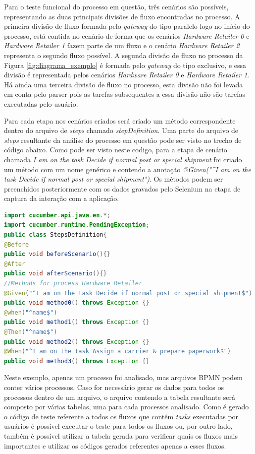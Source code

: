 \documentclass[12pt]{article}
\begin{document}
Para o teste funcional do processo em questão, três cenários são possíveis, representando as duas principais divisões de fluxo encontradas no processo. A primeira divisão de fluxo formada pelo \emph{gateway} do tipo paralelo logo no início do processo, está contida no cenário de forma que os cenários \emph{Hardware Retailer 0} e \emph{Hardware Retailer 1} fazem parte de um fluxo e o cenário \emph{Hardware Retailer 2} representa o segundo fluxo possível. A segunda divisão de fluxo no processo da Figura \ref{fig:diagrama_exemplo} é formada pelo \emph{gateway} do tipo exclusivo, e essa divisão é representada pelos cenários \emph{Hardware Retailer 0} e \emph{Hardware Retailer 1}. Há ainda uma terceira divisão de fluxo no processo, esta divisão não foi levada em conta pelo parser pois as tarefas subsequentes a essa divisão não são tarefas executadas pelo usuário.

Para cada etapa nos cenários criados será criado um método correspondente dentro do arquivo de \emph{steps} chamado \emph{stepDefinition}. Uma parte do arquivo de \emph{steps} resultante da análise do processo em questão pode ser visto no trecho de código abaixo. Como pode ser visto neste codigo, para a etapa de cenário chamada \emph{I am on the task Decide if normal post or special shipment} foi criado um método com um nome genérico e contendo a anotação \emph{@Given("\^{}I am on the task Decide if normal post or special shipment\textdollar{}")}. Os métodos podem ser preenchidos posteriormente com os dados gravados pelo Selenium na etapa de captura da interação com a aplicação.

\begin{lstlisting}[language=Java]
import cucumber.api.java.en.*;
import cucumber.runtime.PendingException;
public class StepsDefinition{
@Before
public void beforeScenario(){}
@After
public void afterScenario(){} 
//Methods for process Hardware Retailer
@Given("^I am on the task Decide if normal post or special shipment$") 
public void method0() throws Exception {} 
@when("^name$") 
public void method1() throws Exception {} 
@Then("^name$") 
public void method2() throws Exception {} 
@When("^I am on the task Assign a carrier & prepare paperwork$") 
public void method3() throws Exception {} 
\end{lstlisting}

Neste exemplo, apenas um processo foi analisado, mas arquivos BPMN podem conter vários processos. Caso for necessário gerar os dados para todos os processos dentro de um arquivo, o arquivo contendo a tabela resultante será composto por várias tabelas, uma para cada processos analisado. Como é gerado o código de teste referente a todos os fluxos que contêm \emph{tasks} executadas por usuários é possível executar o teste para todos os fluxos ou, por outro lado, também é possível utilizar a tabela gerada para verificar quais os fluxos mais importantes e utilizar os códigos gerados referentes apenas a esses fluxos.
\end{document}
